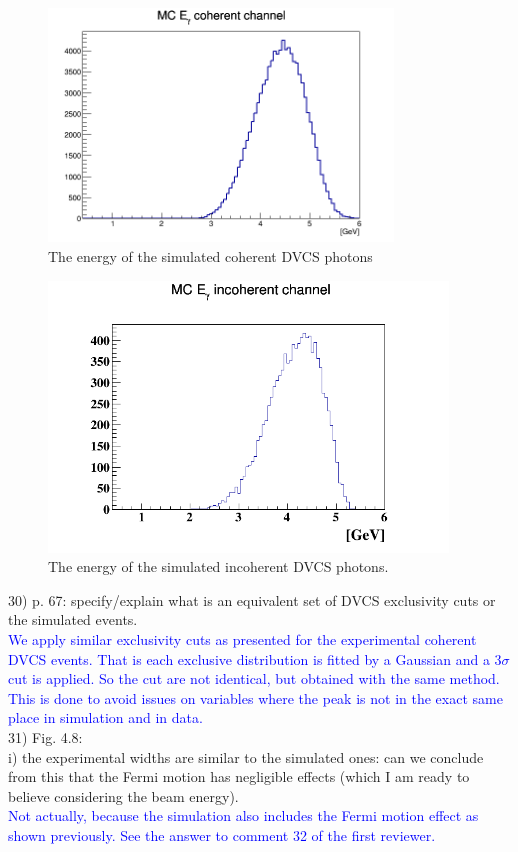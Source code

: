 \begin{figure}[tbp]
\centering
\includegraphics[height=6.2cm]{fig/photon_energy_coh_sim.png}
\caption{The energy of the simulated coherent DVCS photons}
\label{fig:sim_coh}
 \end{figure}

\begin{figure}[tbp]
\centering
\includegraphics[height=7.2cm]{fig/photon_energy_incoh_sim.png}
\caption{The energy of the simulated incoherent DVCS photons.}
\label{fig:sim_incoh}
 \end{figure}

30) p. 67: specify/explain what is an equivalent set of DVCS exclusivity cuts 
or the simulated events.\\
\textcolor{blue}{ We apply similar exclusivity cuts as presented for the 
experimental coherent DVCS events. That is each exclusive distribution is fitted 
by a Gaussian and a 3$\sigma$ cut is applied. So the cut are not
identical, but obtained with the same method. This is done to avoid issues on 
variables where the peak is not in the exact same place in simulation and in 
data. }\\

31) Fig. 4.8: \\
i) the experimental widths are similar to the simulated ones: can we conclude 
from this that the Fermi motion has negligible effects (which I am ready to 
believe considering the beam energy). \\
 \textcolor{blue}{
   Not actually, because the simulation also includes the Fermi motion effect 
as shown previously. See the answer to comment 32 of the first reviewer.  }\\
  
